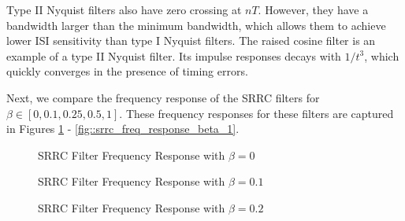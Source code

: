 \documentclass{article}
\begin{document}
Type II Nyquist filters also have zero crossing at $nT$. However, they have a bandwidth larger than the minimum bandwidth, which allows them to achieve lower ISI sensitivity than type I Nyquist filters. The raised cosine filter is an example of a type II Nyquist filter. Its impulse responses decays with $1/t^3$, which quickly converges in the presence of timing errors.

Next, we compare the frequency response of the SRRC filters for $\beta \in [0,0.1,0.25,0.5,1]$. These frequency responses for these filters are captured in Figures \ref{fig::srrc_freq_response_beta_0} - \ref{fig::srrc_freq_response_beta_1}.

\begin{figure}[H]
	\centerline{}
	\caption{SRRC Filter Frequency Response with $\beta=0$}
	\label{fig::srrc_freq_response_beta_0}
\end{figure}

\begin{figure}[H]
	\centerline{}
	\caption{SRRC Filter Frequency Response with $\beta=0.1$}
	\label{fig::srrc_freq_response_beta_0_1}
\end{figure}

\begin{figure}[H]
	\centerline{}
	\caption{SRRC Filter Frequency Response with $\beta=0.2$}
	\label{fig::srrc_freq_response_beta_0_2}
\end{figure}
\end{document}
